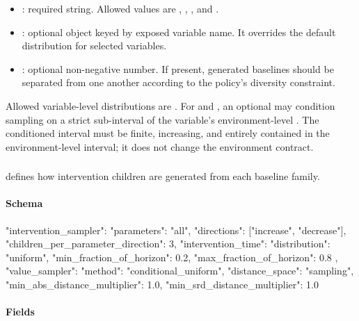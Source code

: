 \documentclass[11pt]{article}
\begin{document}
\begin{itemize}
\item {}: required string. Allowed values are , , , and .
\item {}: optional object keyed by exposed variable name. It overrides the default distribution for selected variables.
\item {}: optional non-negative number. If present, generated baselines should be separated from one another according to the policy's diversity constraint.
\end{itemize}

Allowed variable-level distributions are .
For  and , an optional
 may condition sampling on a strict sub-interval
of the variable's environment-level .  The conditioned
interval must be finite, increasing, and entirely contained in the
environment-level interval; it does not change the environment contract.

\subsubsection*{\texorpdfstring{}{intervention\_sampler}}

 defines how intervention children are generated from each baseline family.

\paragraph{Schema}

\begin{DocCode}
"intervention_sampler": {
  "parameters": "all",
  "directions": ["increase", "decrease"],
  "children_per_parameter_direction": 3,
  "intervention_time": {
    "distribution": "uniform",
    "min_fraction_of_horizon": 0.2,
    "max_fraction_of_horizon": 0.8
  },
  "value_sampler": {
    "method": "conditional_uniform",
    "distance_space": "sampling",
    "min_abs_distance_multiplier": 1.0,
    "min_srd_distance_multiplier": 1.0
  }
}
\end{DocCode}

\paragraph{Fields}
\end{document}
